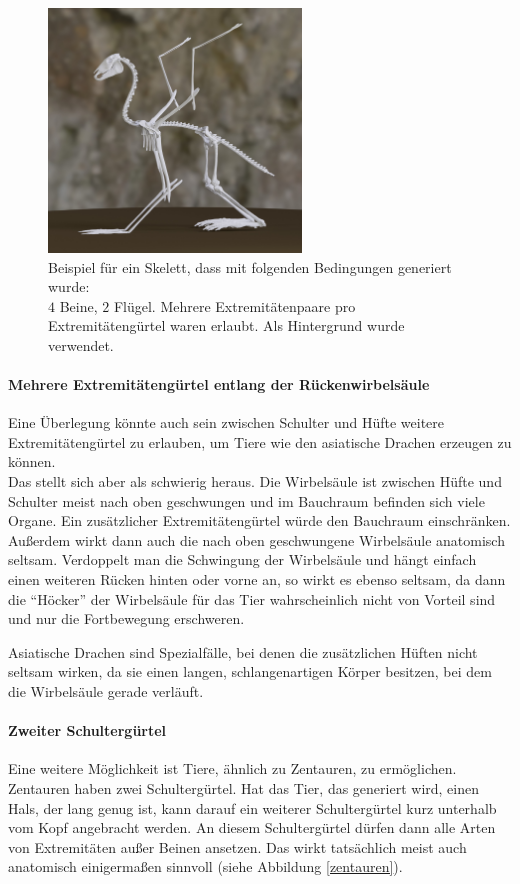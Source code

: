 \begin{figure}
 \centering
 \includegraphics[width=0.6\textwidth]{../java_skeleton_generation/example_skeletons/pegasus.jpg}
 \caption{Beispiel für ein Skelett, dass mit folgenden Bedingungen generiert wurde:\\ $4$ Beine, $2$ Flügel. Mehrere Extremitätenpaare pro Extremitätengürtel waren erlaubt. Als Hintergrund wurde \cite{background} verwendet.}
 \label{pegasus}
\end{figure}


\paragraph{Mehrere Extremitätengürtel entlang der Rückenwirbelsäule}
Eine Überlegung könnte auch sein zwischen Schulter und Hüfte weitere Extremitätengürtel zu erlauben, um \zb Tiere wie den asiatische Drachen erzeugen zu können. \\
Das stellt sich aber als schwierig heraus. Die Wirbelsäule ist zwischen Hüfte und Schulter meist nach oben geschwungen und im Bauchraum befinden sich viele Organe. Ein zusätzlicher Extremitätengürtel würde den Bauchraum einschränken. Außerdem wirkt dann auch die nach oben geschwungene Wirbelsäule anatomisch seltsam.
Verdoppelt man die Schwingung der Wirbelsäule und hängt einfach einen weiteren Rücken hinten oder vorne an, so wirkt es ebenso seltsam, da dann die "`Höcker"' der Wirbelsäule für das Tier wahrscheinlich nicht von Vorteil sind und nur die Fortbewegung erschweren.

Asiatische Drachen sind Spezialfälle, bei denen die zusätzlichen Hüften nicht seltsam wirken, da sie einen langen, schlangenartigen Körper besitzen, bei dem die Wirbelsäule gerade verläuft.

\paragraph{Zweiter Schultergürtel}
Eine weitere Möglichkeit ist Tiere, ähnlich zu Zentauren, zu ermöglichen. Zentauren haben zwei Schultergürtel. Hat das Tier, das generiert wird, einen Hals, der lang genug ist, kann darauf ein weiterer Schultergürtel kurz unterhalb vom Kopf angebracht werden. An diesem Schultergürtel dürfen dann alle Arten von Extremitäten außer Beinen ansetzen. Das wirkt tatsächlich meist auch anatomisch einigermaßen sinnvoll (siehe Abbildung \ref{zentauren}).

